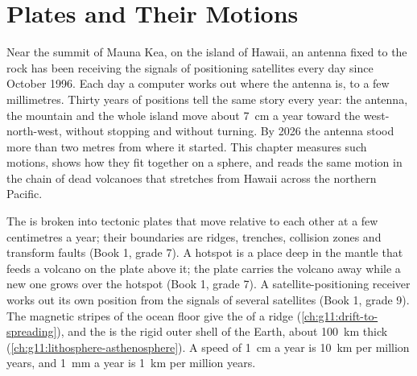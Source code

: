 \chapter{Plates and Their Motions}\label{ch:g11:plate-motions}

Near the summit of Mauna Kea, on the island of Hawaii, an antenna fixed to the
rock has been receiving the signals of positioning satellites every day since
October 1996. Each day a computer works out where the antenna is, to a few
millimetres. Thirty years of positions tell the same story every year: the
antenna, the mountain and the whole island move about \qty{7}{cm} a year
toward the west-north-west, without stopping and without turning. By 2026 the
antenna stood more than two metres from where it started. This chapter
measures such motions, shows how they fit together on a sphere, and reads the
same motion in the chain of dead volcanoes that stretches from Hawaii across
the northern Pacific.

\begin{recall}
The  is broken into tectonic plates that move relative to each
other at a few centimetres a year; their boundaries are ridges, trenches,
collision zones and transform faults (Book 1, grade 7). A hotspot is a place
deep in the mantle that feeds a volcano on the plate above it; the plate
carries the volcano away while a new one grows over the hotspot (Book 1,
grade 7). A satellite-positioning receiver works out its own position from
the signals of several satellites (Book 1, grade 9). The magnetic stripes of
the ocean floor give the  of a ridge
(\cref{ch:g11:drift-to-spreading}), and the  is the rigid outer
shell of the Earth, about \qty{100}{km} thick
(\cref{ch:g11:lithosphere-asthenosphere}). A speed of \qty{1}{cm} a year is
\qty{10}{km} per million years, and \qty{1}{mm} a year is \qty{1}{km} per
million years.
\end{recall}

